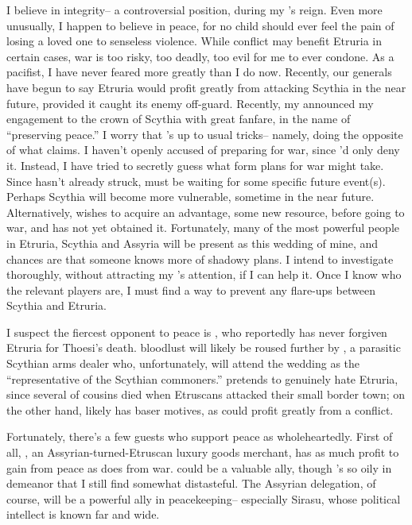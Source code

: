 \documentclass[char]{Kos}
\begin{document}
I believe in integrity-- a controversial position, during my \cEtruriaKing{\parent}'s reign. Even more unusually, I happen to believe in peace, for no child should ever feel the pain of losing a loved one to senseless violence. While conflict may benefit Etruria in certain cases, war is too risky, too deadly, too evil for me to ever condone. As a pacifist, I have never feared more greatly than I do now. Recently, our generals have begun to say Etruria would profit greatly from attacking Scythia in the near future, provided it caught its enemy off-guard. Recently, my \cEtruriaKing{\parent} announced my engagement to the crown \cBride{\prince} of Scythia with great fanfare, in the name of ``preserving peace.'' I worry that \cEtruriaKing{\Parent}'s up to \cEtruriaKing{\their} usual tricks-- namely, doing the opposite of what \cEtruriaKing{\they} claims. I haven't openly accused \cEtruriaKing{\them} of preparing for war, since \cEtruriaKing{\they}'d only deny it. Instead, I have tried to secretly guess what form \cEtruriaKing{\their} plans for war might take. Since \cEtruriaKing{\they} hasn't already struck, \cEtruriaKing{\They} must be waiting for some specific future event(s). Perhaps Scythia will become more vulnerable, sometime in the near future. Alternatively, \cEtruriaKing{\they} wishes to acquire an advantage, some new resource, before going to war, and \cEtruriaKing{\they} has not yet obtained it. Fortunately, many of the most powerful people in Etruria, Scythia and Assyria will be present as this wedding of mine, and chances are that someone knows more of \cEtruriaKing{\their} shadowy plans. I intend to investigate thoroughly, without attracting my \cEtruriaKing{\parent}'s attention, if I can help it. Once I know who the relevant players are, I must find a way to prevent any flare-ups between Scythia and Etruria.

I suspect the fiercest opponent to peace is \cScythiaQueen{\Monarch} \cScythiaQueen{}, who reportedly has never forgiven Etruria for Thoesi's death. \cScythiaQueen{\Their} bloodlust will likely be roused further by \cArmsDealer{}, a parasitic Scythian arms dealer who, unfortunately, will attend the wedding as the ``representative of the Scythian commoners.'' \cArmsDealer{\They} pretends to genuinely hate Etruria, since several of \cArmsDealer{\their} cousins died when Etruscans attacked their small border town; on the other hand, \cArmsDealer{\they} likely has baser motives, as \cArmsDealer{\they} could profit greatly from a conflict. 

Fortunately, there's a few guests who support peace as wholeheartedly. First of all, \cMerchant{}, an Assyrian-turned-Etruscan luxury goods merchant, has as much profit to gain from peace as \cArmsDealer{} does from war. \cMerchant{} could be a valuable ally, though \cMerchant{\they}'s so oily in \cMerchant{\their} demeanor that I still find \cMerchant{\them} somewhat distasteful. The Assyrian delegation, of course, will be a powerful ally in peacekeeping-- especially Sirasu, whose political intellect is known far and wide.
\end{document}
